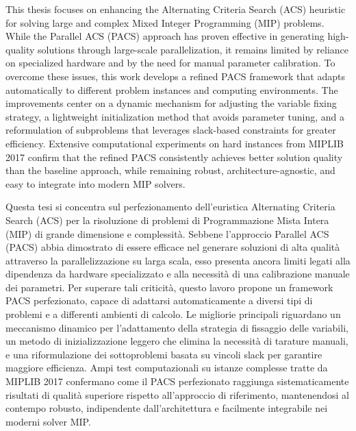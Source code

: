 \begin{Abstract}
    This thesis focuses on enhancing the Alternating Criteria Search (ACS) heuristic for solving large and complex Mixed Integer Programming (MIP) problems. While the Parallel ACS (PACS) approach has proven effective in generating high-quality solutions through large-scale parallelization, it remains limited by reliance on specialized hardware and by the need for manual parameter calibration. To overcome these issues, this work develops a refined PACS framework that adapts automatically to different problem instances and computing environments. The improvements center on a dynamic mechanism for adjusting the variable fixing strategy, a lightweight initialization method that avoids parameter tuning, and a reformulation of subproblems that leverages slack-based constraints for greater efficiency. Extensive computational experiments on hard instances from MIPLIB 2017 confirm that the refined PACS consistently achieves better solution quality than the baseline approach, while remaining robust, architecture-agnostic, and easy to integrate into modern MIP solvers.
\end{Abstract}
\newpage
\begin{Abstract}
    Questa tesi si concentra sul perfezionamento dell’euristica Alternating Criteria Search (ACS) per la risoluzione di problemi di Programmazione Mista Intera (MIP) di grande dimensione e complessità. Sebbene l’approccio Parallel ACS (PACS) abbia dimostrato di essere efficace nel generare soluzioni di alta qualità attraverso la parallelizzazione su larga scala, esso presenta ancora limiti legati alla dipendenza da hardware specializzato e alla necessità di una calibrazione manuale dei parametri. Per superare tali criticità, questo lavoro propone un framework PACS perfezionato, capace di adattarsi automaticamente a diversi tipi di problemi e a differenti ambienti di calcolo. Le migliorie principali riguardano un meccanismo dinamico per l’adattamento della strategia di fissaggio delle variabili, un metodo di inizializzazione leggero che elimina la necessità di tarature manuali, e una riformulazione dei sottoproblemi basata su vincoli slack per garantire maggiore efficienza. Ampi test computazionali su istanze complesse tratte da MIPLIB 2017 confermano come il PACS perfezionato raggiunga sistematicamente risultati di qualità superiore rispetto all’approccio di riferimento, mantenendosi al contempo robusto, indipendente dall’architettura e facilmente integrabile nei moderni solver MIP.
\end{Abstract}


